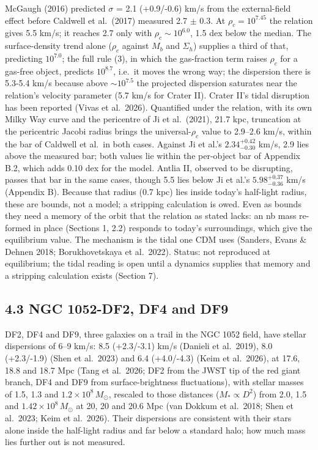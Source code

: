 \documentclass[
  10pt,
]{article}
\begin{document}
McGaugh (2016) predicted $\sigma$ = 2.1 (+0.9/-0.6) km/s from the external-field effect before Caldwell et al.~(2017) measured 2.7 $\pm$ 0.3. At $\rho_c=10^{7.45}$ the relation gives 5.5 km/s; it reaches 2.7 only with $\rho_c\sim 10^{6.0}$, 1.5 dex below the median. The surface-density trend alone ($\rho_c$ against $M_b$ and $\Sigma_h$) supplies a third of that, predicting $10^{7.0}$; the full rule (3), in which the gas-fraction term raises $\rho_c$ for a gas-free object, predicts $10^{8.7}$, i.e.\ it moves the wrong way; the dispersion there is 5.3-5.4 km/s because above $\sim 10^{7.5}$ the projected dispersion saturates near the relation's velocity parameter (5.7 km/s for Crater II). Crater II's tidal disruption has been reported (Vivas et al.~2026). Quantified under the relation, with its own Milky Way curve and the pericentre of Ji et al.~(2021), 21.7 kpc, truncation at the pericentric Jacobi radius brings the universal-$\rho_c$ value to 2.9--2.6 km/s, within the bar of Caldwell et al.\ in both cases. Against Ji et al.'s $2.34^{+0.42}_{-0.30}$ km/s, 2.9 lies above the measured bar; both values lie within the per-object bar of Appendix B.2, which adds 0.10 dex for the model. Antlia II, observed to be disrupting, passes that bar in the same cases, though 5.5 lies below Ji et al.'s $5.98^{+0.37}_{-0.36}$ km/s (Appendix B). Because that radius (0.7 kpc) lies inside today's half-light radius, these are bounds, not a model; a stripping calculation is owed. Even as bounds they need a memory of the orbit that the relation as stated lacks: an nb mass re-formed in place (Sections 1, 2.2) responds to today's surroundings, which give the equilibrium value. The mechanism is the tidal one CDM uses (Sanders, Evans \& Dehnen 2018; Borukhovetskaya et al.~2022). Status: not reproduced at equilibrium; the tidal reading is open until a dynamics supplies that memory and a stripping calculation exists (Section 7).

\subsection{4.3 NGC 1052-DF2, DF4 and DF9}

DF2, DF4 and DF9, three galaxies on a trail in the NGC 1052 field, have stellar dispersions of 6--9 km/s: 8.5 (+2.3/-3.1) km/s (Danieli et al.~2019), 8.0 (+2.3/-1.9) (Shen et al.~2023) and 6.4 (+4.0/-4.3) (Keim et al.~2026), at 17.6, 18.8 and 18.7 Mpc (Tang et al.~2026; DF2 from the JWST tip of the red giant branch, DF4 and DF9 from surface-brightness fluctuations), with stellar masses of 1.5, 1.3 and $1.2\times10^8\,M_\odot$, rescaled to those distances ($M_*\propto D^2$) from 2.0, 1.5 and $1.42\times10^8\,M_\odot$ at 20, 20 and 20.6 Mpc (van Dokkum et al.~2018; Shen et al.~2023; Keim et al.~2026). Their dispersions are consistent with their stars alone inside the half-light radius and far below a standard halo; how much mass lies further out is not measured.
\end{document}
